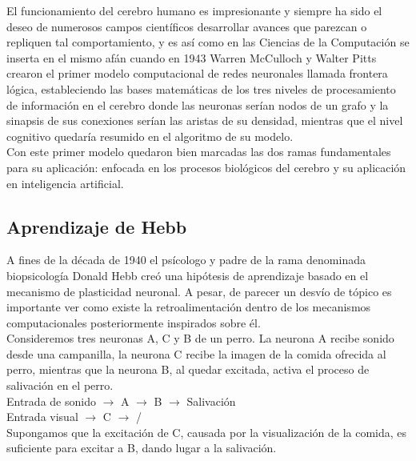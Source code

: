 \documentclass{llncs}
\begin{document}
\begin{multicols}{2}[]
El funcionamiento del cerebro humano es impresionante y siempre ha sido el deseo de numerosos campos cient\'ificos
desarrollar avances que parezcan o repliquen tal comportamiento, y es as\'i como en las Ciencias de la Computaci\'on
se inserta en el mismo af\'an cuando en 1943 \cite{foundations} Warren McCulloch y Walter Pitts crearon el primer modelo computacional
de redes neuronales llamada frontera l\'ogica, estableciendo las bases matem\'aticas de los tres niveles de procesamiento
de informaci\'on en el cerebro donde las neuronas ser\'ian nodos de un grafo y la sinapsis de sus conexiones ser\'ian las
aristas de su densidad, mientras que el nivel cognitivo quedar\'ia resumido en el algoritmo de su mode\-lo. \\

Con este primer modelo quedaron bien marcadas las dos ramas fundamentales para su aplicaci\'on: enfocada en los
procesos biol\'ogicos del cerebro y su aplicaci\'on en inteligencia artificial. \\

\subsection{Aprendizaje de Hebb}

A fines de la d\'ecada de 1940 el ps\'icologo y padre de la rama denominada biopsicolog\'ia Donald Hebb cre\'o una hip\'otesis
de aprendizaje basado en el mecanismo de plasticidad neuronal. A pesar, de parecer un desv\'io de t\'opico es importante ver
como existe la retroalimentaci\'on dentro de los mecanismos computacionales posteriormente inspirados sobre \'el.\\

Consideremos tres neuronas A, C y B de un perro. La neurona A recibe sonido desde una campanilla, la neurona C recibe la
imagen de la comida ofrecida al perro, mientras que la neurona B, al quedar excitada, activa el proceso de salivaci\'on en el perro.\\

Entrada de sonido $\rightarrow$ A $\rightarrow$ B $\rightarrow$ Salivaci\'on\\

Entrada visual $\rightarrow$ C $\rightarrow$  /\\

Supongamos que la excitaci\'on de C, causada por la visualizaci\'on de la comida, es suficiente para excitar a B, dando lugar a la 
salivaci\'on. \\


\end{multicols}
\end{document}
